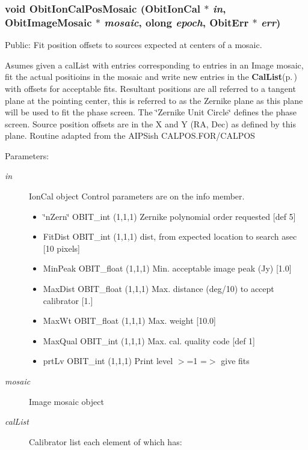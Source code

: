 \subsubsection{\setlength{\rightskip}{0pt plus 5cm}void Obit\-Ion\-Cal\-Pos\-Mosaic ({\bf Obit\-Ion\-Cal} $\ast$ {\em in}, {\bf Obit\-Image\-Mosaic} $\ast$ {\em mosaic}, {\bf olong} {\em epoch}, {\bf Obit\-Err} $\ast$ {\em err})}\label{ObitIonCal_8h_a15}


Public: Fit position offsets to sources expected at centers of a mosaic. 

Asumes given a cal\-List with entries corresponding to entries in an Image mosaic, fit the actual positioins in the mosaic and write new entries in the {\bf Cal\-List}{\rm (p.\,\pageref{structCalList})} with offsets for acceptable fits. Resultant positions are all referred to a tangent plane at the pointing center, this is referred to as the Zernike plane as this plane will be used to fit the phase screen. The \char`\"{}Zernike Unit Circle\char`\"{} defines the phase screen. Source position offsets are in the X and Y (RA, Dec) as defined by this plane. Routine adapted from the AIPSish CALPOS.FOR/CALPOS \begin{Desc}
\item[Parameters:]
\begin{description}
\item[{\em in}]Ion\-Cal object Control parameters are on the info member. \begin{itemize}
\item \char`\"{}n\-Zern\char`\"{} OBIT\_\-int (1,1,1) Zernike polynomial order requested [def 5] \item Fit\-Dist OBIT\_\-int (1,1,1) dist, from expected location to search asec [10 pixels] \item Min\-Peak OBIT\_\-float (1,1,1) Min. acceptable image peak (Jy) [1.0] \item Max\-Dist OBIT\_\-float (1,1,1) Max. distance (deg/10) to accept calibrator [1.] \item Max\-Wt OBIT\_\-float (1,1,1) Max. weight [10.0] \item Max\-Qual OBIT\_\-int (1,1,1) Max. cal. quality code [def 1] \item prt\-Lv OBIT\_\-int (1,1,1) Print level $>$=1 =$>$ give fits \end{itemize}
\item[{\em mosaic}]Image mosaic object \item[{\em cal\-List}]Calibrator list each element of which has: \begin{itemize}

\end{itemize}
\end{description}
\end{Desc}
